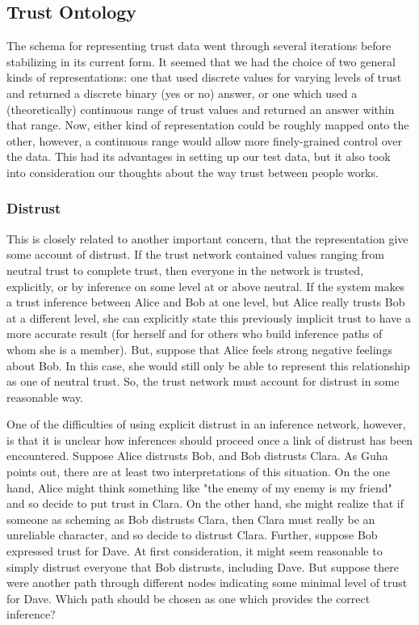 \documentclass[onecolumn]{acm_proc_article-sp}
\begin{document}
\subsection{Trust Ontology}
The schema for representing trust data went through several iterations before stabilizing in its current form.  It seemed that we had the choice of two general kinds of representations:  one that used discrete values for varying levels of trust and returned a discrete binary (yes or no) answer, or one which used a (theoretically) continuous range of trust values and returned an answer within that range.  Now, either kind of representation could be roughly mapped onto the other, however, a continuous range would allow more finely-grained control over the data.  This had its advantages in setting up our test data, but it also took into consideration our thoughts about the way trust between people works.  

\subsubsection{Distrust}
This is closely related to another important concern, that the representation give some account of distrust.  If the trust network contained values ranging from neutral trust to complete trust, then everyone in the network is trusted, explicitly, or by inference on some level at or above neutral.  If the system makes a trust inference between Alice and Bob at one level, but Alice really trusts Bob at a different level, she can explicitly state this previously implicit trust to have a more accurate result (for herself and for others who build inference paths of whom she is a member).  But, suppose that Alice feels strong negative feelings about Bob.  In this case, she would still only be able to represent this relationship as one of neutral trust.  So, the trust network must account for distrust in some reasonable way.

One of the difficulties of using explicit distrust in an inference network, however, is that it is unclear how inferences should proceed once a link of distrust has been encountered.  Suppose Alice distrusts Bob, and Bob distrusts Clara.  As Guha points out\cite{guha04propagation}, there are at least two interpretations of this situation.  On the one hand, Alice might think something like "the enemy of my enemy is my friend" and so decide to put trust in Clara.  On the other hand, she might realize that if someone as scheming as Bob distrusts Clara, then Clara must really be an unreliable character, and so decide to distrust Clara.  Further, suppose Bob expressed trust for Dave.  At first consideration, it might seem reasonable to simply distrust everyone that Bob distrusts, including Dave.  But suppose there were another path through different nodes indicating some minimal level of trust for Dave.  Which path should be chosen as one which provides the correct inference?
\end{document}
